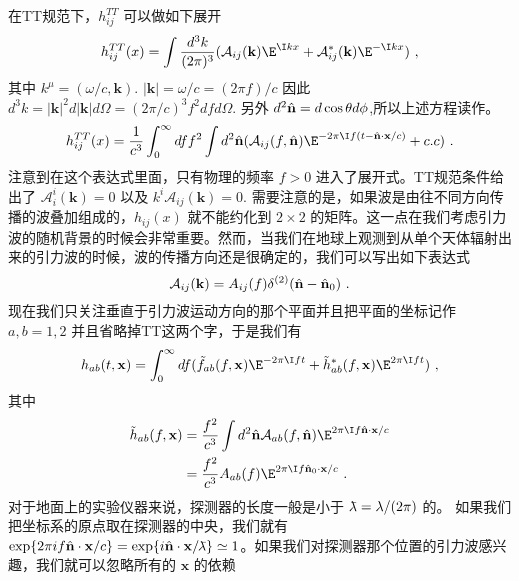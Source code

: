 在TT规范下，$h^{TT}_{ij}$ 可以做如下展开
\begin{equation}
h^{TT}_{ij}(x) = \int \frac{d^3 k}{(2\pi)^3} (\mathcal A_{ij}(\mathbf k) \E^{\I kx} + \mathcal A_{ij}^* (\mathbf k) \E^{-\I k x} ) ~,
\end{equation}
其中 $k^\mu = (\omega/c,\mathbf k)$. $|\mathbf k| = \omega/c = (2\pi f)/c$ 因此 $d^3 k = |\mathbf k|^2 d|\mathbf k| d\Omega = (2\pi/c)^3 f^2 df d\Omega $. 另外 $d^2\hat{\bf{n}} = d\cos\theta d\phi$,所以上述方程读作。
\begin{equation}\label{eq_TTGaug_4}
h^{TT}_{ij}(x) = \frac{1}{c^3} \int^\infty_0 df f^2 \int d^2 \hat{ \bf{n} } ( \mathcal A_{ij} (f,\hat{ \bf{n} }) \E^{-2\pi \I f(t-\hat{ {\bf n} } \cdot {\bf x} /c  )}  + {c.c} ) ~.
\end{equation}
注意到在这个表达式里面，只有物理的频率 $f>0$ 进入了展开式。TT规范条件给出了 $\mathcal A^i_i (\mathbf k) =0 $ 以及 $k^i \mathcal A_{ij} (\mathbf k) =0 $. 需要注意的是，如果波是由往不同方向传播的波叠加组成的，$h_{ij}(x)$ 就不能约化到 $2\times 2$ 的矩阵。这一点在我们考虑引力波的随机背景的时候会非常重要。然而，当我们在地球上观测到从单个天体辐射出来的引力波的时候，波的传播方向还是很确定的，我们可以写出如下表达式
\begin{equation}
\mathcal A_{ij} (\mathbf k) = A_{ij} (f) \delta^{(2)} (\hat{  \mathbf n } - \hat{ {\bf n} }_0 )~.
\end{equation}
现在我们只关注垂直于引力波运动方向的那个平面并且把平面的坐标记作 $a,b = 1,2$ 并且省略掉TT这两个字，于是我们有
\begin{equation}
h_{ab} (t,\mathbf x ) = \int^\infty_0 df ( \tilde f_{ab} (f,\mathbf x) \E^{-2\pi \I f t} + \tilde h^*_{ab} (f,\mathbf x) \E^{2\pi \I f t} ) ~,
\end{equation}
其中
\begin{equation}
\begin{aligned}
\tilde h_{ab} (f,\mathbf x) & = \frac{f^2}{c^3} \int d^2 \hat{  \mathbf n } \mathcal A_{ab} (f, \hat{\mathbf{n}}) \E^{2\pi \I f \hat{  \mathbf n } \cdot \mathbf x / c  } \\
& = \frac{f^2}{c^3} A_{ab} (f) \E^{2\pi \I f {\hat{\mathbf n}_0 \cdot \mathbf x /c  } }~.
\end{aligned}
\end{equation} 
对于地面上的实验仪器来说，探测器的长度一般是小于 ${\mkern0.7mu {\bar{\phantom{a}}} \mkern -11mu\lambda} = \lambda/(2\pi)$ 的。 如果我们把坐标系的原点取在探测器的中央，我们就有 $\exp  \{   2\pi i f \hat{ \mathbf n } \cdot \mathbf x/c \} = \exp \{ i \hat{ {\bf n} } \cdot \mathbf x / {\mkern0.75mu {\bar{\phantom{a}}} \mkern -11.75mu\lambda} \} \simeq 1  $。如果我们对探测器那个位置的引力波感兴趣，我们就可以忽略所有的 $\mathbf x$ 的依赖

